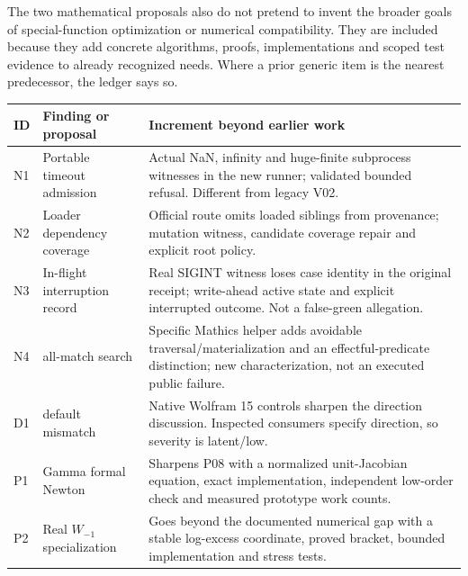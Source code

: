 \documentclass[11pt,letterpaper]{article}
\newcommand{\code}[1]{\texttt{\detokenize{#1}}}
\begin{document}
The two mathematical proposals also do not pretend to invent the broader goals of special-function optimization or numerical compatibility. They are included because they add concrete algorithms, proofs, implementations and scoped test evidence to already recognized needs. Where a prior generic item is the nearest predecessor, the ledger says so.

\begin{longtable}{@{}P{0.08\textwidth}P{0.32\textwidth}P{0.52\textwidth}@{}}
\toprule
ID & Finding or proposal & Increment beyond earlier work\\\midrule\endhead
N1 & Portable timeout admission & Actual NaN, infinity and huge-finite subprocess witnesses in the new runner; validated bounded refusal. Different from legacy V02.\\
N2 & Loader dependency coverage & Official \code{init.m} route omits loaded siblings from provenance; mutation witness, candidate coverage repair and explicit root policy.\\
N3 & In-flight interruption record & Real SIGINT witness loses case identity in the original receipt; write-ahead active state and explicit interrupted outcome. Not a false-green allegation.\\
N4 & \code{FirstPosition} all-match search & Specific Mathics helper adds avoidable traversal/materialization and an effectful-predicate distinction; new characterization, not an executed public failure.\\
D1 & \code{Limit} default mismatch & Native Wolfram 15 controls sharpen the direction discussion. Inspected consumers specify direction, so severity is latent/low.\\
P1 & Gamma formal Newton & Sharpens P08 with a normalized unit-Jacobian equation, exact implementation, independent low-order check and measured prototype work counts.\\
P2 & Real $W_{-1}$ specialization & Goes beyond the documented numerical gap with a stable log-excess coordinate, proved bracket, bounded implementation and stress tests.\\\bottomrule
\end{longtable}
\end{document}
